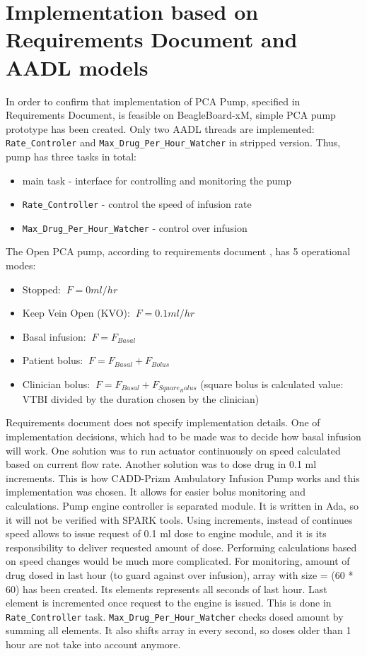\section{Implementation based on Requirements Document and AADL models}
\label{pcapumpimpl:manual}

In order to confirm that implementation of PCA Pump, specified in Requirements Document, is feasible on BeagleBoard-xM, simple PCA pump prototype has been created. Only two AADL threads are implemented: \lstinline{Rate_Controler} and \lstinline{Max_Drug_Per_Hour_Watcher} in stripped version. Thus, pump has three tasks in total:
\begin{itemize}
    \item main task - interface for controlling and monitoring the pump
    \item \lstinline{Rate_Controller} - control the speed of infusion rate
    \item \lstinline{Max_Drug_Per_Hour_Watcher} - control over infusion
\end{itemize}

The Open PCA pump, according to requirements document \cite{PcaReq}, has 5 operational modes:
\begin{itemize}
	\item Stopped: $\displaystyle\ F = 0 ml/hr$
	\item Keep Vein Open (KVO): $\displaystyle\ F = 0.1 ml/hr$
	\item Basal infusion: $\displaystyle\ F = F_{Basal}$
	\item Patient bolus: $\displaystyle\ F = F_{Basal} + F_{Bolus}$
	\item Clinician bolus: $\displaystyle\ F = F_{Basal} + F_{Square_Bolus}$ (square bolus is calculated value: VTBI divided by the duration chosen by the clinician)
\end{itemize}

Requirements document does not specify implementation details. One of implementation decisions, which had to be made was to decide how basal infusion will work. One solution was to run actuator continuously on speed calculated based on current flow rate. Another solution was to dose drug in 0.1 ml increments. This is how CADD-Prizm Ambulatory Infusion Pump \cite{CADD-PrizmAmbulatoryInfusionPump:Online} works and this implementation was chosen. It allows for easier bolus monitoring and calculations. Pump engine controller is separated module. It is written in Ada, so it will not be verified with SPARK tools. Using increments, instead of continues speed allows to issue request of 0.1 ml dose to engine module, and it is its responsibility to deliver requested amount of dose. Performing calculations based on speed changes would be much more complicated. For monitoring, amount of drug dosed in last hour (to guard against over infusion), array with size = (60 * 60) has been created. Its elements represents all seconds of last hour. Last element is incremented once request to the engine is issued. This is done in \lstinline{Rate_Controller} task. \lstinline{Max_Drug_Per_Hour_Watcher} checks dosed amount by summing all elements. It also shifts array in every second, so doses older than 1 hour are not take into account anymore.

